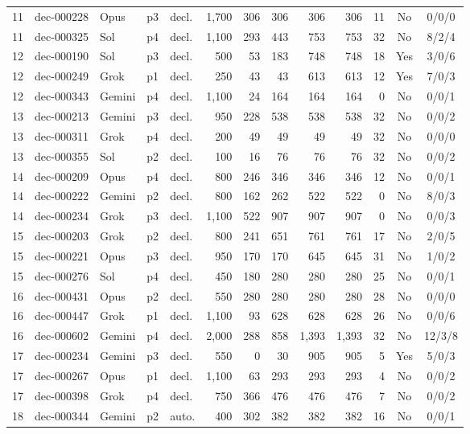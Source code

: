 {\begin{longtable}{@{}rllllrrrrrrcc@{}}
11 & dec-000228 & Opus & p3 & decl. & 1,700 & 306 & 306 & 306 & 306 & 11 & No & 0/0/0 \\
11 & dec-000325 & Sol & p4 & decl. & 1,100 & 293 & 443 & 753 & 753 & 32 & No & 8/2/4 \\
12 & dec-000190 & Sol & p3 & decl. & 500 & 53 & 183 & 748 & 748 & 18 & Yes & 3/0/6 \\
12 & dec-000249 & Grok & p1 & decl. & 250 & 43 & 43 & 613 & 613 & 12 & Yes & 7/0/3 \\
12 & dec-000343 & Gemini & p4 & decl. & 1,100 & 24 & 164 & 164 & 164 & 0 & No & 0/0/1 \\
13 & dec-000213 & Gemini & p3 & decl. & 950 & 228 & 538 & 538 & 538 & 32 & No & 0/0/2 \\
13 & dec-000311 & Grok & p4 & decl. & 200 & 49 & 49 & 49 & 49 & 32 & No & 0/0/0 \\
13 & dec-000355 & Sol & p2 & decl. & 100 & 16 & 76 & 76 & 76 & 32 & No & 0/0/2 \\
14 & dec-000209 & Opus & p4 & decl. & 800 & 246 & 346 & 346 & 346 & 12 & No & 0/0/1 \\
14 & dec-000222 & Gemini & p2 & decl. & 800 & 162 & 262 & 522 & 522 & 0 & No & 8/0/3 \\
14 & dec-000234 & Grok & p3 & decl. & 1,100 & 522 & 907 & 907 & 907 & 0 & No & 0/0/3 \\
15 & dec-000203 & Grok & p2 & decl. & 800 & 241 & 651 & 761 & 761 & 17 & No & 2/0/5 \\
15 & dec-000221 & Opus & p3 & decl. & 950 & 170 & 170 & 645 & 645 & 31 & No & 1/0/2 \\
15 & dec-000276 & Sol & p4 & decl. & 450 & 180 & 280 & 280 & 280 & 25 & No & 0/0/1 \\
16 & dec-000431 & Opus & p2 & decl. & 550 & 280 & 280 & 280 & 280 & 28 & No & 0/0/0 \\
16 & dec-000447 & Grok & p1 & decl. & 1,100 & 93 & 628 & 628 & 628 & 26 & No & 0/0/6 \\
16 & dec-000602 & Gemini & p4 & decl. & 2,000 & 288 & 858 & 1,393 & 1,393 & 32 & No & 12/3/8 \\
17 & dec-000234 & Gemini & p3 & decl. & 550 & 0 & 30 & 905 & 905 & 5 & Yes & 5/0/3 \\
17 & dec-000267 & Opus & p1 & decl. & 1,100 & 63 & 293 & 293 & 293 & 4 & No & 0/0/2 \\
17 & dec-000398 & Grok & p4 & decl. & 750 & 366 & 476 & 476 & 476 & 7 & No & 0/0/2 \\
18 & dec-000344 & Gemini & p2 & auto. & 400 & 302 & 382 & 382 & 382 & 16 & No & 0/0/1 \\

\end{longtable}}
